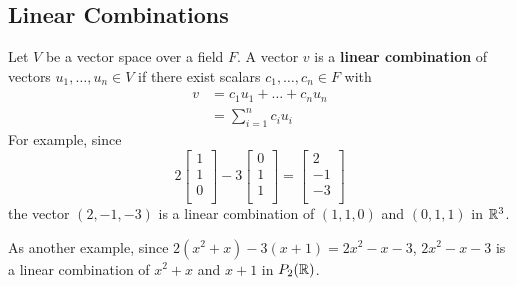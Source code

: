 \documentclass{article}
\begin{document}
\subsection{Linear Combinations}
\begin{definition}
  Let $V$ be a vector space over a field $F$. A vector $v$ is a \textbf{linear combination} of vectors $u_1, \ldots, u_n \in V$ if there exist scalars $c_1, \ldots, c_n \in F$ with
  \begin{align*}
    v &= c_1u_1 + \dots + c_nu_n\\
    &= \sum_{i=1}^n c_iu_i
  \end{align*}
  For example, since
  \[
    2
    \begin{bmatrix}
      1\\
      1\\
      0\\
    \end{bmatrix}
    -3
    \begin{bmatrix}
      0\\
      1\\
      1\\
    \end{bmatrix}
    =
    \begin{bmatrix}
      2\\
      -1\\
      -3\\
    \end{bmatrix}
  \]
  the vector $(2, -1, -3)$ is a linear combination of $(1, 1, 0)$ and $(0, 1, 1)$ in $\mathbb{R}^3$.

  As another example, since
  $2(x^2+x) - 3(x+1) = 2x^2-x-3$, $2x^2-x-3$ is a linear combination of $x^2+x$ and $x+1$ in $P_2(\mathbb{R})$.
\end{definition}
\end{document}
